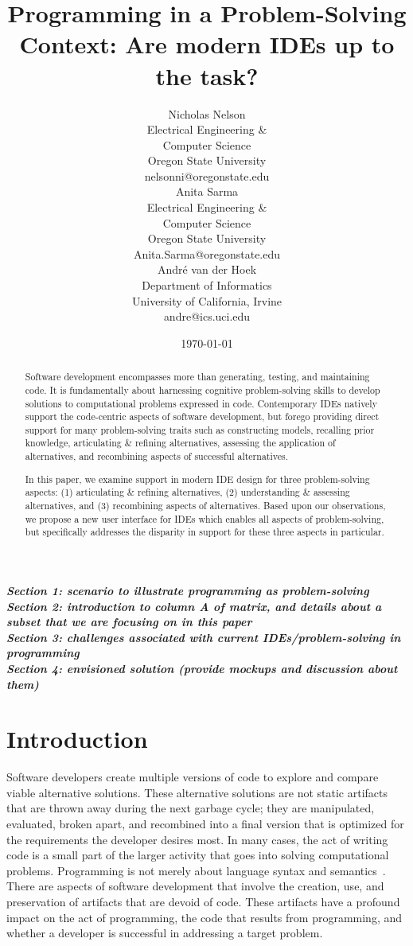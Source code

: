 \documentclass{ppig}
\title{Programming in a Problem-Solving Context: Are modern IDEs up to the task?}
\author{Nicholas Nelson \\
  Electrical Engineering \&\\ Computer Science \\
  Oregon State University \\
  nelsonni@oregonstate.edu \\
  \And
  Anita Sarma \\
  Electrical Engineering \&\\ Computer Science \\
  Oregon State University \\
  Anita.Sarma@oregonstate.edu \\
  \And
  André van der Hoek \\
  Department of Informatics \\
  University of California, Irvine \\
  andre@ics.uci.edu
}
\date{\today}
\newcommand{\bold}[1]{\textit{\textbf{\color{aoblue}#1}}}
\begin{document}
\maketitle
\thispagestyle{empty}

\begin{abstract}

Software development encompasses more than generating, testing, and maintaining code.
It is fundamentally about harnessing cognitive problem-solving skills to develop solutions to computational problems expressed in code.
Contemporary IDEs natively support the code-centric aspects of software development, but forego providing direct support for many problem-solving traits such as constructing models, recalling prior knowledge, articulating \& refining alternatives, assessing the application of alternatives, and recombining aspects of successful alternatives.

In this paper, we examine support in modern IDE design for three problem-solving aspects: (1) articulating \& refining alternatives, (2) understanding \& assessing alternatives, and (3) recombining aspects of alternatives.
Based upon our observations, we propose a new user interface for IDEs which enables all aspects of problem-solving, but specifically addresses the disparity in support for these three aspects in particular. 
\end{abstract}

\bold{Section 1: scenario to illustrate programming as problem-solving\\
Section 2: introduction to column A of matrix, and details about a subset that we are focusing on in this paper\\
Section 3: challenges associated with current IDEs/problem-solving in programming\\
Section 4: envisioned solution (provide mockups and discussion about them)}

\section{Introduction}
Software developers create multiple versions of code to explore and compare viable alternative solutions.
These alternative solutions are not static artifacts that are thrown away during the next garbage cycle; they are manipulated, evaluated, broken apart, and recombined into a final version that is optimized for the requirements the developer desires most.
In many cases, the act of writing code is a small part of the larger activity that goes into solving computational problems.
Programming is not merely about language syntax and semantics~\cite{loksa2016programming}.
There are aspects of software development that involve the creation, use, and preservation of artifacts that are devoid of code.
These artifacts have a profound impact on the act of programming, the code that results from programming, and whether a developer is successful in addressing a target problem.
\end{document}

